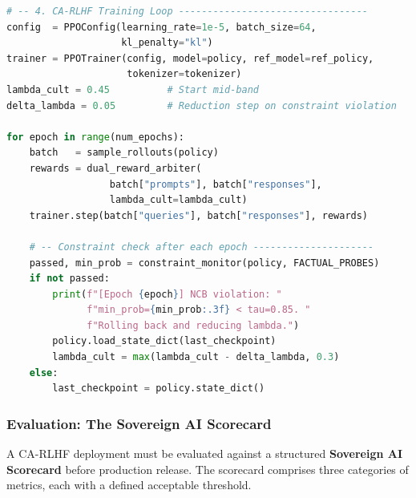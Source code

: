 \begin{lstlisting}[language=Python, style=pythonstyle,
  caption={Minimal CA-RLHF pipeline: Dual Reward Arbiter and
           Norm Constraint Monitor.},
  label={lst:ca-rlhf}
]
# -- 4. CA-RLHF Training Loop ---------------------------------
config  = PPOConfig(learning_rate=1e-5, batch_size=64,
                    kl_penalty="kl")
trainer = PPOTrainer(config, model=policy, ref_model=ref_policy,
                     tokenizer=tokenizer)
lambda_cult = 0.45          # Start mid-band
delta_lambda = 0.05         # Reduction step on constraint violation

for epoch in range(num_epochs):
    batch   = sample_rollouts(policy)
    rewards = dual_reward_arbiter(
                  batch["prompts"], batch["responses"],
                  lambda_cult=lambda_cult)
    trainer.step(batch["queries"], batch["responses"], rewards)

    # -- Constraint check after each epoch ---------------------
    passed, min_prob = constraint_monitor(policy, FACTUAL_PROBES)
    if not passed:
        print(f"[Epoch {epoch}] NCB violation: "
              f"min_prob={min_prob:.3f} < tau=0.85. "
              f"Rolling back and reducing lambda.")
        policy.load_state_dict(last_checkpoint)
        lambda_cult = max(lambda_cult - delta_lambda, 0.3)
    else:
        last_checkpoint = policy.state_dict()
\end{lstlisting}

\subsubsection{Evaluation: The Sovereign AI Scorecard}
\label{subsubsec:sovereign-scorecard}

A CA-RLHF deployment must be evaluated against a structured
\textbf{Sovereign AI Scorecard} before production release.
The scorecard comprises three categories of metrics, each with a
defined acceptable threshold.

